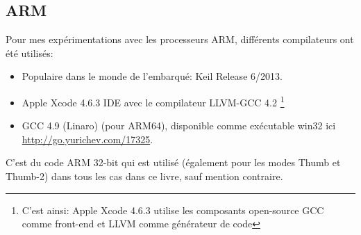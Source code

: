 \subsection{ARM}
\label{sec:hw_ARM}

\myindex{\idevices}
Pour mes expérimentations avec les processeurs ARM, différents compilateurs ont été utilisés:

\begin{itemize}
\item Populaire dans le monde de l'embarqué: Keil Release 6/2013.

\item Apple Xcode 4.6.3 IDE avec le compilateur LLVM-GCC 4.2
\footnote{C'est ainsi: Apple Xcode 4.6.3 utilise les composants open-source GCC comme front-end et LLVM
comme générateur de code} %

\item GCC 4.9 (Linaro) (pour ARM64), disponible comme exécutable win32 ici \url{http://go.yurichev.com/17325}.

\end{itemize}

C'est du code ARM 32-bit qui est utilisé (également pour les modes Thumb et Thumb-2) dans tous les
cas dans ce livre, sauf mention contraire.








